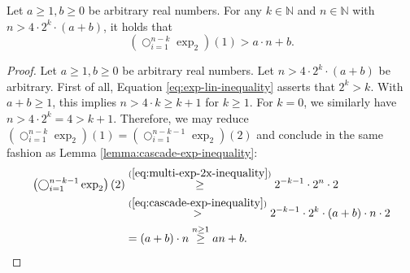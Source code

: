 \begin{corollary}
	\label{cor:cascade-exp-inequality-basis}
	Let $a\geq 1,b\geq 0$ be arbitrary real numbers.
	For any $k\in\mathbb{N}$ and $n\in\mathbb{N}$ with $n>4\cdot 2^k\cdot (a+b)$, it holds that
	\begin{equation}
		\left(\bigcirc_{i=1}^{n-k}\exp_2\right)(1) > a\cdot n + b.
	\end{equation}
\end{corollary}
\begin{proof}
	Let $a\geq 1,b\geq 0$ be arbitrary real numbers.
	Let $n>4\cdot 2^k \cdot (a+b)$ be arbitrary. 
	First of all, Equation \ref{eq:exp-lin-inequality} asserts that $2^k>k$.
	With $a+b\geq 1$, this implies $n>4\cdot k\geq k+1$ for $k\geq 1$.
	For $k=0$, we similarly have $n>4\cdot 2^k=4>k+1$.
	Therefore, we may reduce $\left(\bigcirc_{i=1}^{n-k}\exp_2\right)(1)=\left(\bigcirc_{i=1}^{n-k-1}\exp_2\right)(2)$ and conclude in the same fashion as Lemma \ref{lemma:cascade-exp-inequality}:
	\begin{align}
		\left(\bigcirc_{i=1}^{n-k-1}\exp_2\right)(2) &\overset{(\ref{eq:multi-exp-2x-inequality})}{\geq} 2^{-k-1}\cdot 2^n \cdot 2\\
		&\overset{(\ref{eq:cascade-exp-inequality})}{>} 2^{-k-1} \cdot 2^k\cdot (a+b)\cdot n \cdot 2\\
		& = (a+b)\cdot n \overset{n\geq 1}{\geq} an+b.
	\end{align}
\end{proof}
